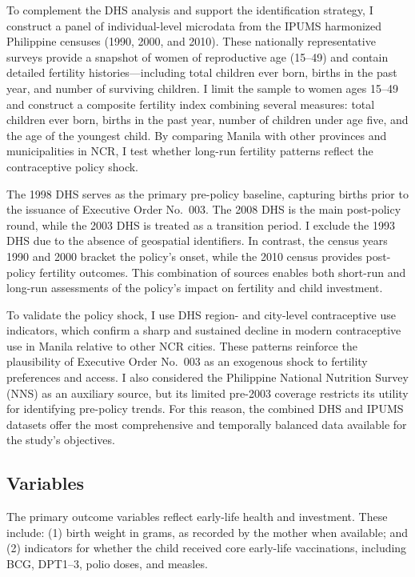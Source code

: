 \documentclass[]{AEA}
\begin{document}
To complement the DHS analysis and support the identification strategy,
I construct a panel of individual-level microdata from the IPUMS
harmonized Philippine censuses (1990, 2000, and 2010). These nationally
representative surveys provide a snapshot of women of reproductive age
(15--49) and contain detailed fertility histories---including total
children ever born, births in the past year, and number of surviving
children. I limit the sample to women ages 15--49 and construct a
composite fertility index combining several measures: total children
ever born, births in the past year, number of children under age five,
and the age of the youngest child. By comparing Manila with other
provinces and municipalities in NCR, I test whether long-run fertility
patterns reflect the contraceptive policy shock.

The 1998 DHS serves as the primary pre-policy baseline, capturing births
prior to the issuance of Executive Order No.~003. The 2008 DHS is the
main post-policy round, while the 2003 DHS is treated as a transition
period. I exclude the 1993 DHS due to the absence of geospatial
identifiers. In contrast, the census years 1990 and 2000 bracket the
policy's onset, while the 2010 census provides post-policy fertility
outcomes. This combination of sources enables both short-run and
long-run assessments of the policy's impact on fertility and child
investment.

To validate the policy shock, I use DHS region- and city-level
contraceptive use indicators, which confirm a sharp and sustained
decline in modern contraceptive use in Manila relative to other NCR
cities. These patterns reinforce the plausibility of Executive Order
No.~003 as an exogenous shock to fertility preferences and access. I
also considered the Philippine National Nutrition Survey (NNS) as an
auxiliary source, but its limited pre-2003 coverage restricts its
utility for identifying pre-policy trends. For this reason, the combined
DHS and IPUMS datasets offer the most comprehensive and temporally
balanced data available for the study's objectives.

\subsection{Variables}

The primary outcome variables reflect early-life health and investment.
These include: (1) birth weight in grams, as recorded by the mother when
available; and (2) indicators for whether the child received core
early-life vaccinations, including BCG, DPT1--3, polio doses, and
measles.
\end{document}

